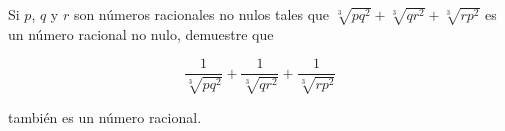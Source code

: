 Si $p$, $q$ y $r$ son números racionales no nulos tales que $\sqrt[3]{pq^2}+\sqrt[3]{qr^2}+\sqrt[3]{rp^2}$ es un número racional no nulo, demuestre que 

$$\frac{1}{\sqrt[3]{pq^2}}+\frac{1}{\sqrt[3]{qr^2}}+\frac{1}{\sqrt[3]{rp^2}}$$ 

también es un número racional.
